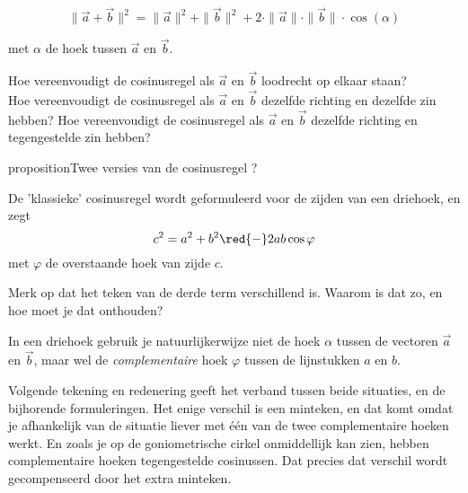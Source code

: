 \documentclass{ximera}
\begin{document}
\[
\| \vec{a} + \vec{b} \|^2 = \| \vec{a} \|^2 + \| \vec{b} \|^2 + 2 \cdot \|\vec{a}\| \cdot \|\vec{b}\| \cdot \cos(\alpha)
\]

met \(\alpha\) de hoek tussen \(\vec{a}\) en \(\vec{b}\). 

\begin{quickquestion*}{}{}
  Hoe vereenvoudigt de cosinusregel als \(\vec{a}\) en \(\vec{b}\) loodrecht op elkaar staan? \\
  Hoe vereenvoudigt de cosinusregel als \(\vec{a}\) en \(\vec{b}\) dezelfde richting en dezelfde zin hebben? 
  Hoe vereenvoudigt de cosinusregel als \(\vec{a}\) en \(\vec{b}\) dezelfde richting en tegengestelde zin hebben? 
\end{quickquestion*}


\begin{expandable}{proposition}{Twee versies van de cosinusregel ?}


De 'klassieke' cosinusregel wordt geformuleerd voor de zijden van een driehoek, en zegt  
\[
    c^2 = a^2 + b^2 \red{ - } 2 a b \cos\varphi
\]
met \(\varphi\) de overstaande hoek van zijde \(c\). 

Merk op dat het teken van de derde term verschillend is. Waarom is dat zo, en hoe moet je dat onthouden?

In een driehoek gebruik je natuurlijkerwijze niet de hoek $\alpha$ tussen de vectoren $\vec{a}$ en $\vec{b}$, maar wel de \textit{complementaire} hoek $\varphi$ tussen de lijnstukken $a$ en $b$.

Volgende tekening en redenering geeft het verband tussen beide situaties, en de bijhorende formuleringen. 
Het enige verschil is een minteken, en dat komt omdat je afhankelijk van de situatie liever met één van de twee complementaire hoeken werkt. 
En zoals je op de goniometrische cirkel onmiddellijk kan zien, hebben complementaire hoeken tegengestelde cosinussen. 
Dat precies dat verschil wordt gecompenseerd door het extra minteken.


    \begin{image}[0.8\textwidth]

\end{image}
\end{expandable}
\end{document}
